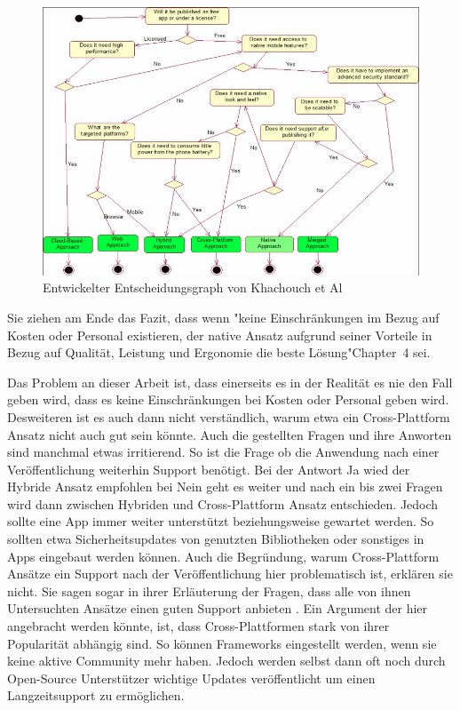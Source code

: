 \begin{figure}[ht]
  \centering
  \includegraphics[width=\textwidth,keepaspectratio]{images/IEEE_Khachouch_Decision_Graph.jpg}
  \caption{Entwickelter Entscheidungsgraph von Khachouch et Al \cite{IEEE_Khackouch_Al}}
  \label{fig:decision_graph_IEEE_related_work}
\end{figure}

Sie ziehen am Ende das Fazit, dass wenn "keine Einschränkungen im Bezug auf Kosten oder Personal existieren, der native Ansatz aufgrund seiner Vorteile in Bezug auf Qualität, Leistung und Ergonomie die beste Lösung"\cite{IEEE_Khackouch_Al}{Chapter~4} sei.

Das Problem an dieser Arbeit ist, dass einerseits es in der Realität es nie den Fall geben wird, dass es keine Einschränkungen bei Kosten oder Personal geben wird. Desweiteren ist es auch dann nicht verständlich, warum etwa ein Cross-Plattform Ansatz nicht auch gut sein könnte. Auch die gestellten Fragen und ihre Anworten sind manchmal etwas irritierend. So ist die Frage ob die Anwendung nach einer Veröffentlichung weiterhin Support benötigt. Bei der Antwort Ja wied der Hybride Ansatz empfohlen bei Nein geht es weiter und nach ein bis zwei Fragen wird dann zwischen Hybriden und Cross-Plattform Ansatz entschieden. Jedoch sollte eine App immer weiter unterstützt beziehungsweise gewartet werden. So sollten etwa Sicherheitsupdates von genutzten Bibliotheken oder sonstiges in Apps eingebaut werden können. Auch die Begründung, warum Cross-Plattform Ansätze ein Support nach der Veröffentlichung hier problematisch ist, erklären sie nicht. Sie sagen sogar in ihrer Erläuterung der Fragen, dass alle von ihnen Untersuchten Ansätze einen guten Support anbieten \cite{IEEE_Khackouch_Al}. Ein Argument der hier angebracht werden könnte, ist, dass Cross-Plattformen stark von ihrer Popularität abhängig sind. So können Frameworks eingestellt werden, wenn sie keine aktive Community mehr haben. Jedoch werden selbst dann oft noch durch Open-Source Unterstützer wichtige Updates veröffentlicht um einen Langzeitsupport zu ermöglichen.